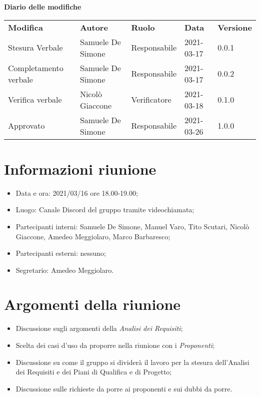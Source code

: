 \documentclass[a4paper]{article}
\begin{document}
    \begin{center}
        \textbf{\Large Diario delle modifiche}\\
        \vspace{10px}
        \begin{table}[h!]
        \centering
        \renewcommand{\arraystretch}{1.8}
        \begin{tabular}{p{150px} p{90px} p{60px} p{60px} p{45px}}
            \rowcolor{logo!70} \textbf{Modifica} & \textbf{Autore} & \textbf{Ruolo} & \textbf{Data} & \textbf{Versione}\\
            Stesura Verbale & Samuele De Simone & Responsabile & 2021-03-17 & 0.0.1 \\    
            Completamento verbale & Samuele De Simone & Responsabile & 2021-03-17 & 0.0.2\\
            Verifica verbale & Nicolò Giaccone & Verificatore & 2021-03-18 & 0.1.0\\
            Approvato & Samuele De Simone & Responsabile & 2021-03-26 & 1.0.0\\
        \end{tabular}
    \end{table}
    \end{center}

    \newpage
    \tableofcontents
    \newpage
    \section{Informazioni riunione}
    \begin{itemize}
        \item Data e ora: 2021/03/16 ore 18.00-19.00;
        \item Luogo: Canale Discord del gruppo tramite videochiamata;
        \item Partecipanti interni: Samuele De Simone, Manuel Varo, Tito Scutari, Nicolò Giaccone, Amedeo Meggiolaro, Marco Barbaresco;
        \item Partecipanti esterni: nessuno;
        \item Segretario: Amedeo Meggiolaro.
    \end{itemize}
    \section{Argomenti della riunione}
    \begin{itemize}
        \item Discussione sugli argomenti della \textit{Analisi dei Requisiti};
        \item Scelta dei casi d'uso da proporre nella riunione con i \textit{Proponenti};
        \item Discussione su come il gruppo si dividerà il lavoro per la stesura dell'Analisi dei Requisiti e dei Piani di Qualifica e di Progetto;
        \item Discussione sulle richieste da porre ai proponenti e sui dubbi da porre.
    \end{itemize}
\end{document}
